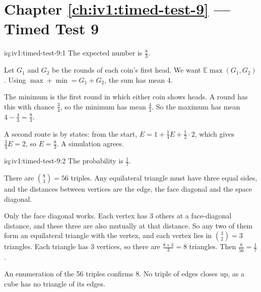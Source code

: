 \section*{Chapter \ref{ch:iv1:timed-test-9} --- Timed Test 9}

\begin{solution}{iq:iv1:timed-test-9:1}
The expected number is $\frac83$.

Let $G_1$ and $G_2$ be the rounds of each coin's first head. We want $\mathbb{E}\max(G_1, G_2)$. Using $\max + \min = G_1 + G_2$, the sum has mean 4.

The minimum is the first round in which either coin shows heads. A round has this with chance $\frac34$, so the minimum has mean $\frac43$. So the maximum has mean $4 - \frac43 = \frac83$.

A second route is by states: from the start, $E = 1 + \frac14E + \frac12 \cdot 2$, which gives $\frac34E = 2$, so $E = \frac83$. A simulation agrees.

\end{solution}

\begin{solution}{iq:iv1:timed-test-9:2}
The probability is $\frac17$.

There are $\binom83 = 56$ triples. Any equilateral triangle must have three equal sides, and the distances between vertices are the edge, the face diagonal and the space diagonal.

Only the face diagonal works. Each vertex has 3 others at a face-diagonal distance, and these three are also mutually at that distance. So any two of them form an equilateral triangle with the vertex, and each vertex lies in $\binom32 = 3$ triangles. Each triangle has 3 vertices, so there are $\frac{8 \times 3}{3} = 8$ triangles. Then $\frac{8}{56} = \frac17$.

An enumeration of the 56 triples confirms 8. No triple of edges closes up, as a cube has no triangle of its edges.

\end{solution}

